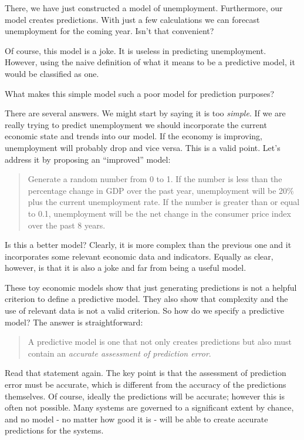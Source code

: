 \documentclass[]{memoir}
\begin{document}
There, we have just constructed a model of unemployment. Furthermore,
our model creates predictions. With just a few calculations we can
forecast unemployment for the coming year. Isn't that convenient?

Of course, this model is a joke. It is useless in predicting
unemployment. However, using the naive definition of what it means to be
a predictive model, it would be classified as one.

What makes this simple model such a poor model for prediction purposes?

There are several answers. We might start by saying it is too
\emph{simple}. If we are really trying to predict unemployment we should
incorporate the current economic state and trends into our model. If the
economy is improving, unemployment will probably drop and vice versa.
This is a valid point. Let's address it by proposing an ``improved''
model:

\begin{quote}
Generate a random number from 0 to 1. If the number is less than the
percentage change in GDP over the past year, unemployment will be 20\%
plus the current unemployment rate. If the number is greater than or
equal to 0.1, unemployment will be the net change in the consumer price
index over the past 8 years.
\end{quote}

Is this a better model? Clearly, it is more complex than the previous
one and it incorporates some relevant economic data and indicators.
Equally as clear, however, is that it is also a joke and far from being
a useful model.

These toy economic models show that just generating predictions is not a
helpful criterion to define a predictive model. They also show that
complexity and the use of relevant data is not a valid criterion. So how
do we specify a predictive model? The answer is straightforward:

\begin{quote}
A predictive model is one that not only creates predictions but also
must contain an \emph{accurate assessment of prediction error}.
\end{quote}

Read that statement again. The key point is that the assessment of
prediction error must be accurate, which is different from the accuracy
of the predictions themselves. Of course, ideally the predictions will
be accurate; however this is often not possible. Many systems are
governed to a significant extent by chance, and no model - no matter how
good it is - will be able to create accurate predictions for the
systems.
\end{document}
